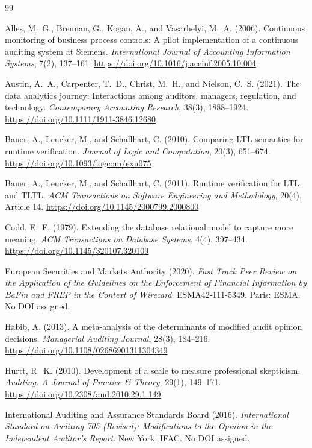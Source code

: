 \documentclass[smallcondensed,envcountsect,natbib]{svjour3}
\begin{document}
\begin{thebibliography}{99}

Alles, M.~G., Brennan, G., Kogan, A., and Vasarhelyi, M.~A. (2006).
Continuous monitoring of business process controls: A pilot implementation of a continuous auditing system at Siemens.
\emph{International Journal of Accounting Information Systems}, 7(2), 137--161. \url{https://doi.org/10.1016/j.accinf.2005.10.004}

Austin, A.~A., Carpenter, T.~D., Christ, M.~H., and Nielson, C.~S. (2021).
The data analytics journey: Interactions among auditors, managers, regulation, and technology.
\emph{Contemporary Accounting Research}, 38(3), 1888--1924. \url{https://doi.org/10.1111/1911-3846.12680}

Bauer, A., Leucker, M., and Schallhart, C. (2010).
Comparing LTL semantics for runtime verification.
\emph{Journal of Logic and Computation}, 20(3), 651--674. \url{https://doi.org/10.1093/logcom/exn075}

Bauer, A., Leucker, M., and Schallhart, C. (2011).
Runtime verification for LTL and TLTL.
\emph{ACM Transactions on Software Engineering and Methodology}, 20(4), Article 14. \url{https://doi.org/10.1145/2000799.2000800}

Codd, E.~F. (1979).
Extending the database relational model to capture more meaning.
\emph{ACM Transactions on Database Systems}, 4(4), 397--434. \url{https://doi.org/10.1145/320107.320109}

European Securities and Markets Authority (2020).
\emph{Fast Track Peer Review on the Application of the Guidelines on the Enforcement of Financial Information by BaFin and FREP in the Context of Wirecard}.
ESMA42-111-5349. Paris: ESMA. No DOI assigned.

Habib, A. (2013).
A meta-analysis of the determinants of modified audit opinion decisions.
\emph{Managerial Auditing Journal}, 28(3), 184--216. \url{https://doi.org/10.1108/02686901311304349}

Hurtt, R.~K. (2010).
Development of a scale to measure professional skepticism.
\emph{Auditing: A Journal of Practice \& Theory}, 29(1), 149--171. \url{https://doi.org/10.2308/aud.2010.29.1.149}

International Auditing and Assurance Standards Board (2016).
\emph{International Standard on Auditing 705 (Revised): Modifications to the Opinion in the Independent Auditor's Report}.
New York: IFAC. No DOI assigned.


\end{thebibliography}
\end{document}
